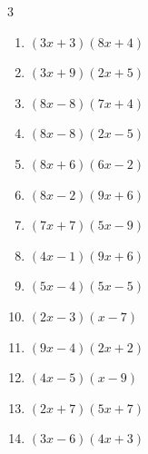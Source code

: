 \begin{multicols}{3}
\begin{enumerate}
  \item $(3x+3)(8x+4)$


  \item $(3x+9)(2x+5)$


  \item $(8x-8)(7x+4)$


  \item $(8x-8)(2x-5)$


  \item $(8x+6)(6x-2)$


  \item $(8x-2)(9x+6)$


  \item $(7x+7)(5x-9)$


  \item $(4x-1)(9x+6)$


  \item $(5x-4)(5x-5)$


  \item $(2x-3)(x-7)$


  \item $(9x-4)(2x+2)$


  \item $(4x-5)(x-9)$


  \item $(2x+7)(5x+7)$


\columnbreak %

\resetques

  \item $(3x-6)(4x+3)$



\end{enumerate}
\end{multicols}
